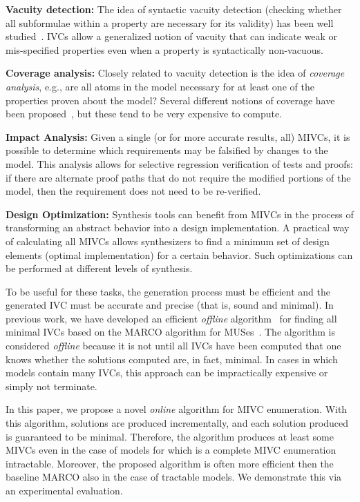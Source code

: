 \noindent \textbf{Vacuity detection:} The idea of syntactic vacuity detection (checking whether all subformulae within a property are necessary for its validity) has been well studied~\cite{Kupferman03:Vacuity}.   IVCs allow a generalized notion of vacuity that can indicate weak or mis-specified properties even when a property is syntactically non-vacuous.

\noindent \textbf{Coverage analysis:} Closely related to vacuity detection is the idea of {\em coverage analysis}, e.g., are all atoms in the model necessary for at least one of the properties proven about the model?  Several different notions of coverage have been proposed~\cite{chockler_coverage_2003,kupferman_theory_2008}, but these tend to be very expensive to compute.

\noindent \textbf{Impact Analysis:} Given a single (or for more accurate results, all) MIVCs, it is possible to determine which requirements may be falsified by changes to the model.  This analysis allows for selective regression verification of tests and proofs: if there are alternate proof paths that do not require the modified portions of the model, then the requirement does not need to be re-verified.

\noindent \textbf{Design Optimization:} Synthesis tools can benefit from MIVCs in the process of transforming an abstract behavior into a design implementation. A practical way of calculating all MIVCs allows synthesizers to find a minimum set of design elements (optimal implementation) for a certain behavior. Such optimizations can be performed at different levels of synthesis.

To be useful for these tasks, the generation process must be efficient and the generated IVC must be accurate and precise (that is, sound and minimal).  In previous work, we have developed an efficient {\em offline} algorithm~\cite{Ghass17AllIVCs} for finding all minimal IVCs based on the MARCO algorithm for MUSes~\cite{marco2016fast}.  The algorithm is considered {\em offline} because it is not until all IVCs have been computed that one knows whether the solutions computed are, in fact, minimal.  In cases in which models contain many IVCs, this approach can be impractically expensive or simply not terminate.

In this paper, we propose a novel {\em online} algorithm for MIVC enumeration.  With this algorithm, solutions are produced incrementally, and each solution produced is guaranteed to be minimal.  
Therefore, the algorithm produces at least some MIVCs even in the case of models for which is a complete MIVC enumeration intractable. Moreover, the proposed algorithm is often more efficient then the baseline MARCO also in the case of tractable models.
We demonstrate this via an experimental evaluation.

